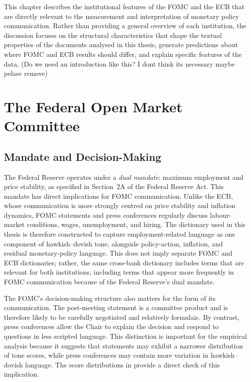 
This chapter describes the institutional features of the FOMC and
the ECB that are directly relevant to the measurement and
interpretation of monetary policy communication. Rather than
providing a general overview of each institution, the discussion
focuses on the structural characteristics that shape the textual
properties of the documents analysed in this thesis, generate
predictions about where FOMC and ECB results should differ, and
explain specific features of the data. (Do we need an introduction like this? I dont think its necessary maybe pelase remove)


\section{The Federal Open Market Committee}
\label{sec:inst_fomc}

\subsection{Mandate and Decision-Making}
\label{sec:inst_fomc_mandate}

The Federal Reserve operates under a \emph{dual mandate}: maximum
employment and price stability, as specified in Section~2A of the
Federal Reserve Act. This mandate has direct implications for FOMC
communication. Unlike the ECB, whose communication is more strongly
centred on price stability and inflation dynamics, FOMC statements and
press conferences regularly discuss labour-market conditions, wages,
unemployment, and hiring. The dictionary used in this thesis is therefore
constructed to capture employment-related language as one component of
hawkish--dovish tone, alongside policy-action, inflation, and residual
monetary-policy language. This does not imply separate FOMC and ECB
dictionaries; rather, the same cross-bank dictionary includes terms that
are relevant for both institutions, including terms that appear more
frequently in FOMC communication because of the Federal Reserve's dual
mandate.

The FOMC's decision-making structure also matters for the form of its
communication. The post-meeting statement is a committee product and is
therefore likely to be carefully negotiated and relatively formulaic. By
contrast, press conferences allow the Chair to explain the decision and
respond to questions in less scripted language. This distinction is
important for the empirical analysis because it suggests that statements
may exhibit a narrower distribution of tone scores, while press
conferences may contain more variation in hawkish--dovish language. The
score distributions in  provide a direct
check of this implication.

